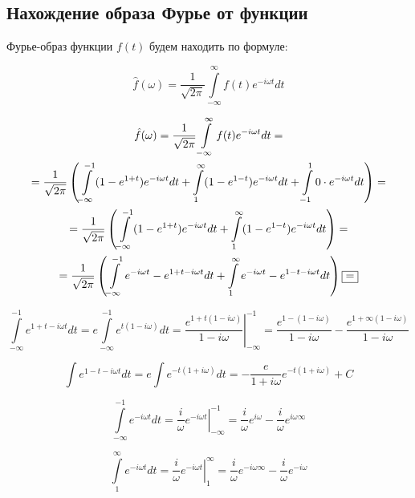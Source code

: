 \documentclass[a5paper, 10pt]{article}
\theoremstyle{definition}
\theoremstyle{plain}
\theoremstyle{remark}
\begin{document}
\subsection{Нахождение образа Фурье от функции}

Фурье-образ функции $f(t)$ будем находить по формуле:

\begin{equation}
\hat{f} (\omega) = \frac{1}{\sqrt{2 \pi}} \int \limits_{-\infty}^{\infty} f(t) e^{-i \omega t} dt
\end{equation}

\begin{multline}
\hat{f} (\omega) = \frac{1}{\sqrt{2 \pi}} \int \limits_{-\infty}^{\infty} f(t) e^{-i \omega t} dt =\\= \frac{1}{\sqrt{2 \pi}} \left( \int \limits_{-\infty}^{-1} (1 - e^{1 + t}) e^{-i \omega t} dt + \int \limits_{1}^{\infty} (1 - e^{1 - t}) e^{-i \omega t} dt + \int \limits_{-1}^{1} 0 \cdot e^{-i \omega t} dt \right) =\\=
\frac{1}{\sqrt{2 \pi}} \left( \int \limits_{-\infty}^{-1} (1 - e^{1 + t}) e^{-i \omega t} dt + \int \limits_{1}^{\infty} (1 - e^{1 - t}) e^{-i \omega t} dt \right) = \\ = \frac{1}{\sqrt{2 \pi}} \left( \int \limits_{-\infty}^{-1}  e^{-i \omega t} - e^{1 + t -i \omega t} dt + \int \limits_{1}^{\infty}  e^{-i \omega t} - e^{1 - t -i \omega t} dt \right) \fbox{=}
\end{multline}


\begin{equation}
\int \limits_{-\infty}^{-1} e^{1 + t -i \omega t} dt = e \int \limits_{-\infty}^{-1} e^{ t (1 -i \omega)} dt = \left. \frac{e^{1 + t (1 -i \omega)}}{1 - i \omega} \right|_{-\infty}^{-1} = \frac{e^{1 - (1 -i \omega)}}{1 - i \omega} - \frac{e^{1 + \infty (1 -i \omega)}}{1 - i \omega}
\end{equation}


\begin{equation}
\int e^{1 - t -i \omega t} dt = e \int e^{- t (1 + i \omega)} dt = -\frac{e}{1 + i \omega}  e^{- t (1 +i \omega)} + C
\end{equation}


\begin{equation}
\int \limits_{-\infty}^{-1}  e^{-i \omega t} dt  = \left. \frac{i}{\omega} e^{-i \omega t} \right|_{-\infty}^{-1} = \frac{i}{\omega} e^{i \omega} - \frac{i}{\omega} e^{i \omega \infty}
\end{equation}


\begin{equation}
\int \limits_{1}^{\infty}  e^{-i \omega t} dt  = \left. \frac{i}{\omega} e^{-i \omega t} \right|_{1}^{\infty} = \frac{i}{\omega} e^{-i \omega \infty} - \frac{i}{\omega} e^{-i \omega }
\end{equation}
\end{document}
